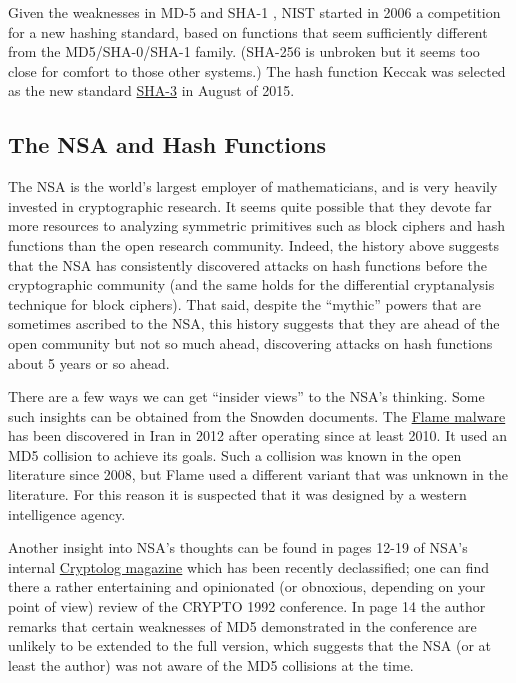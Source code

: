 Given the weaknesses in MD-5 and SHA-1 , NIST started in 2006 a
competition for a new hashing standard, based on functions that seem
sufficiently different from the MD5/SHA-0/SHA-1 family. (SHA-256 is
unbroken but it seems too close for comfort to those other systems.) The
hash function Keccak was selected as the new standard
\href{https://goo.gl/Bx1bu2}{SHA-3} in August of 2015.

\subsection{The NSA and Hash
Functions}\label{The-NSA-and-Hash-Functions}

The NSA is the world's largest employer of mathematicians, and is very
heavily invested in cryptographic research. It seems quite possible that
they devote far more resources to analyzing symmetric primitives such as
block ciphers and hash functions than the open research community.
Indeed, the history above suggests that the NSA has consistently
discovered attacks on hash functions before the cryptographic community
(and the same holds for the differential cryptanalysis technique for
block ciphers). That said, despite the ``mythic'' powers that are
sometimes ascribed to the NSA, this history suggests that they are ahead
of the open community but not so much ahead, discovering attacks on hash
functions about 5 years or so ahead.

There are a few ways we can get ``insider views'' to the NSA's thinking.
Some such insights can be obtained from the Snowden documents. The
\href{https://en.wikipedia.org/wiki/Flame_(malware)}{Flame malware} has
been discovered in Iran in 2012 after operating since at least 2010. It
used an MD5 collision to achieve its goals. Such a collision was known
in the open literature since 2008, but Flame used a different variant
that was unknown in the literature. For this reason it is suspected that
it was designed by a western intelligence agency.

Another insight into NSA's thoughts can be found in pages 12-19 of NSA's
internal
\href{https://www.nsa.gov/public_info/_files/cryptologs/cryptolog_126.pdf}{Cryptolog
magazine} which has been recently declassified; one can find there a
rather entertaining and opinionated (or obnoxious, depending on your
point of view) review of the CRYPTO 1992 conference. In page 14 the
author remarks that certain weaknesses of MD5 demonstrated in the
conference are unlikely to be extended to the full version, which
suggests that the NSA (or at least the author) was not aware of the MD5
collisions at the time.

